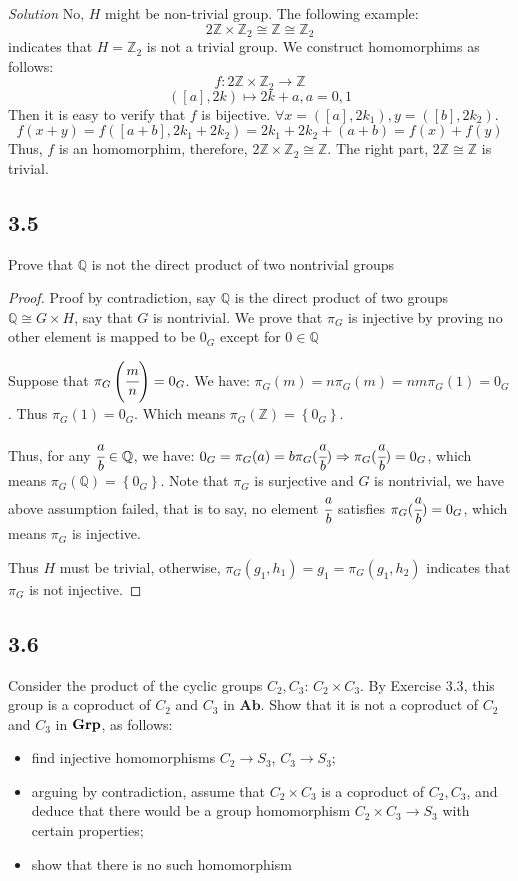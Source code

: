 \documentclass[a4paper, pdf, 12pt]{article}
\newcommand{\catname}[1]{{\normalfont\textbf{#1}}}
\begin{document}
\vspace{0.3cm}
\noindent
\textit{Solution} \quad No, $H$ might be non-trivial group. The following example:
$$
  2\mathbb{Z}\times \mathbb{Z}_2 \cong \mathbb{Z}\cong \mathbb{Z}_2
$$
indicates that $H=\mathbb{Z}_2$ is not a trivial group. We construct homomorphims as follows:
$$
  f: 2\mathbb{Z}\times \mathbb{Z}_2\longrightarrow \mathbb{Z}
$$
$$
  (\left[a\right],2k)\mapsto 2k + a, a=0,1
$$ Then it is easy to verify that $f$ is bijective.
$
  \forall x = (\left[a\right], 2k_1), y = (\left[b\right], 2k_2).
$
$$
  f(x+y) = f(\left[a+b\right],2k_1+2k_2) = 2k_1 + 2k_2 + (a+b) = f(x)+f(y)
$$ Thus, $f$ is an homomorphim, therefore, $2\mathbb{Z}\times \mathbb{Z}_2\cong \mathbb{Z}$. The
right part, $2\mathbb{Z}\cong \mathbb{Z}$ is trivial.


\subsection*{3.5}
Prove that $\mathbb{Q}$ is not the direct product of two nontrivial groups
\begin{proof}
  Proof by contradiction, say $\mathbb{Q}$ is the direct product of two groups $\mathbb{Q}\cong G\times H$, say that
  $G$ is nontrivial. We prove that $\pi_{G}$ is injective by proving no other element is mapped to be $0_{G}$ except for $0\in \mathbb{Q}$

  Suppose that $\pi_{G}\left(\cfrac{m}{n}\right)=0_{G}$. We have: $\pi_{G}(m)=n\pi_{G}(m)=nm\pi_{G}(1) = 0_G$. Thus $\pi_{G}(1)=0_{G}$.
  Which means $\pi_{G}(\mathbb{Z})=\left\{0_G\right\}$.

  Thus, for any $\cfrac{a}{b}\in \mathbb{Q}$, we have: $0_{G}=\pi_{G}(a)=b\pi_{G}(\cfrac{a}{b})\Rightarrow \pi_{G}(\cfrac{a}{b})=0_{G}$, which means
  $\pi_{G}(\mathbb{Q})=\left\{0_G\right\}$. Note that $\pi_{G}$ is surjective and $G$ is nontrivial, we have above assumption failed, that is to say,
  no element $\cfrac{a}{b}$ satisfies $\pi_{G}(\cfrac{a}{b})=0_{G}$, which means $\pi_{G}$ is injective.

  Thus $H$ must be trivial, otherwise, $\pi_{G}(g_1, h_1) = g_1 = \pi_{G}(g_1, h_2)$ indicates that $\pi_{G}$ is not injective.
\end{proof}

\subsection*{3.6}
Consider the product of the cyclic groups $C_2, C_3$: $C_2 \times C_3$. By
Exercise $3.3$, this group is a coproduct of $C_2$ and $C_3$ in $\mathbf{Ab}$. Show that it is not a
coproduct of $C_2$ and $C_3$ in $\catname{Grp}$, as follows:
\begin{itemize}
  \item find injective homomorphisms $C_2 \rightarrow S_3$, $C_3 \rightarrow S_3$;
  \item arguing by contradiction, assume that $C_2 \times C_3$ is a coproduct of $C_2, C_3$, and
        deduce that there would be a group homomorphism $C_2 \times C_3 \rightarrow S_3$ with certain
        properties;
  \item show that there is no such homomorphism
\end{itemize}
\end{document}
